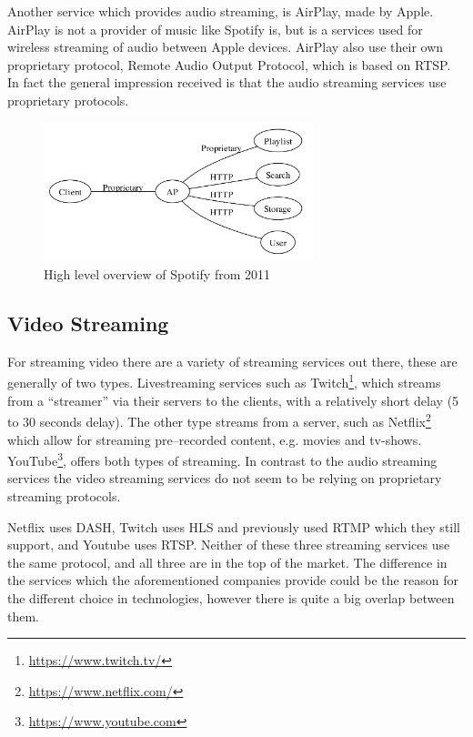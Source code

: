 Another service which provides audio streaming, is AirPlay, made by Apple. 
AirPlay is not a provider of music like Spotify is, but is a services used for wireless streaming of audio between Apple devices.
AirPlay also use their own proprietary protocol, Remote Audio Output Protocol, which is based on \ac{RTSP}.
In fact the general impression received is that the audio streaming services use proprietary protocols.

\begin{figure}[!bht]
    \centering
    \includegraphics[width=0.7\textwidth]{img/spotifyOverview.png}
    \caption{High level overview of Spotify from 2011 \cite{spotifySlides}}
    \label{fig:spotifyOverview}
\end{figure}


\subsection{Video Streaming}
For streaming video there are a variety of streaming services out there, these are generally of two types.
Livestreaming services such as Twitch\footnote{\url{https://www.twitch.tv/}}, which streams from a ``streamer'' via their servers to the clients, with a relatively short delay (5 to 30 seconds delay). 
The other type streams from a server, such as Netflix\footnote{\url{https://www.netflix.com/}} which allow for streaming pre--recorded content, e.g. movies and tv-shows.
YouTube\footnote{\url{https://www.youtube.com}}, offers both types of streaming.
In contrast to the audio streaming services the video streaming services do not seem to be relying on proprietary streaming protocols.

Netflix uses \ac{DASH}, Twitch uses \ac{HLS} and previously used \ac{RTMP} which they still support, and Youtube uses \ac{RTSP}.\cite{netflix}\cite{twitch}\cite{youtube}
Neither of these three streaming services use the same protocol, and all three are in the top of the market.
The difference in the services which the aforementioned companies provide could be the reason for the different choice in technologies, however there is quite a big overlap between them. 

